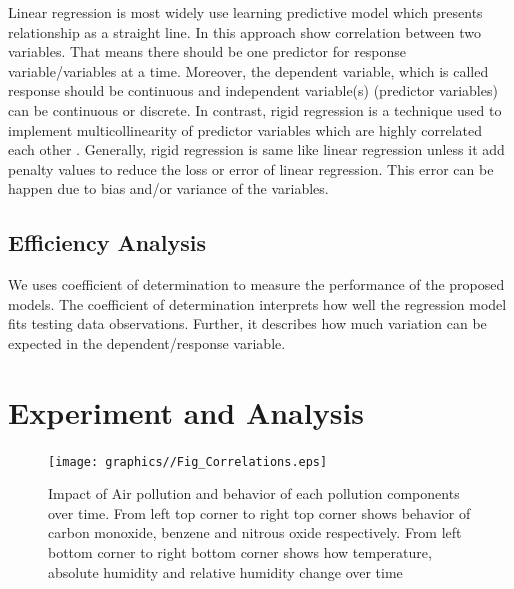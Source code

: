 Linear regression is most widely use learning predictive model 
which presents relationship as a straight line.
In this approach show correlation between two variables.
That means there should be one predictor for response variable/variables at a time.
Moreover, the dependent variable, which is called 
response should be continuous and independent 
variable(s) (predictor variables) can be continuous or discrete. 
In contrast, rigid regression is a technique used 
to implement multicollinearity of predictor variables 
which are highly correlated each other \cite{dong2016moving}.
Generally, rigid regression is same like 
linear regression unless it add penalty values 
to reduce the loss or error of linear regression.
This error can  be happen due to bias and/or variance of the variables.

\subsection{Efficiency Analysis}
We uses coefficient of determination to measure the performance of the proposed models. 
The coefficient of determination interprets 
how well the regression model fits testing data observations.
Further, it describes how much variation 
can be expected in the dependent/response variable.

\section{Experiment and Analysis} \label{sec-experiment}

\begin{figure}
  \texttt{[image: graphics//Fig\_Correlations.eps]}
  \caption{Impact of Air pollution and behavior of each pollution
  components over time. From left top corner to right top corner
  shows behavior of carbon monoxide, benzene and nitrous oxide
  respectively. From left bottom corner to right bottom corner shows
  how temperature, absolute humidity and relative humidity change
  over time} \label{Bias}
\end{figure}


